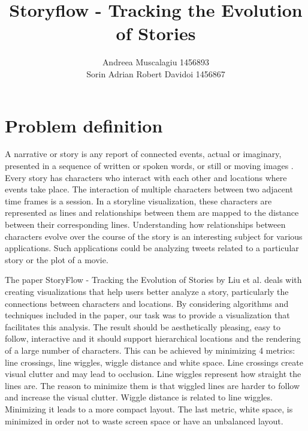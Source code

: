 \documentclass{report}
\begin{document}
\title{Storyflow - Tracking the Evolution of Stories}
\author{Andreea Muscalagiu 1456893\\
Sorin Adrian Robert Davidoi		1456867}
\maketitle
\chapter{Problem definition}
\par
A narrative or story is any report of connected events, actual or imaginary, presented in a sequence of written or spoken words, or still or moving images \cite{Narrative}. Every story has characters who interact with each other and locations where events take place. The interaction of multiple characters between two adjacent time frames is a session. In a storyline visualization, these characters are represented as lines and relationships between them are mapped to the distance between their corresponding lines. Understanding how relationships between characters evolve over the course of the story is an interesting subject for various applications. Such applications could be analyzing tweets related to a particular story or the plot of a movie.

\par The paper StoryFlow - Tracking the Evolution of Stories by Liu et al. deals with creating visualizations that help users better analyze a story, particularly the connections between characters and locations. \cite{liu} By considering algorithms and techniques included in the paper, our task was to provide a visualization that facilitates this analysis. The result should be aesthetically pleasing, easy to follow, interactive and it should support hierarchical locations and the rendering of a large number of characters. This can be achieved by minimizing 4 metrics: line crossings, line wiggles, wiggle distance and white space. Line crossings create visual clutter and may lead to occlusion. Line wiggles represent how straight the lines are. The reason to minimize them is that wiggled lines are harder to follow and increase the visual clutter. Wiggle distance is related to line wiggles. Minimizing it leads to a more compact layout. The last metric, white space, is minimized in order not to waste screen space or have an unbalanced layout.
\end{document}
